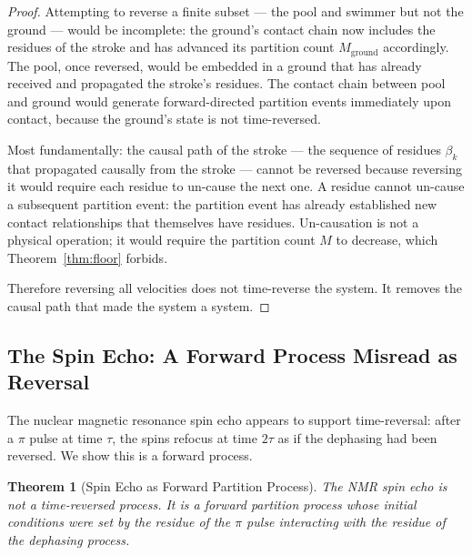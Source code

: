 \documentclass[11pt,twocolumn,a4paper]{article}
\theoremstyle{plain}
\newtheorem{theorem}{Theorem}[section]
\theoremstyle{definition}
\theoremstyle{remark}
\begin{document}
\begin{proof}
Attempting to reverse a finite subset --- the pool and swimmer but not the
ground --- would be incomplete: the ground's contact chain now includes the
residues of the stroke and has advanced its partition count $M_{\mathrm{ground}}$
accordingly. The pool, once reversed, would be embedded in a ground that has
already received and propagated the stroke's residues. The contact chain between
pool and ground would generate forward-directed partition events immediately upon
contact, because the ground's state is not time-reversed.

Most fundamentally: the causal path of the stroke --- the sequence of residues
$\beta_k$ that propagated causally from the stroke --- cannot be reversed because
reversing it would require each residue to un-cause the next one. A residue
cannot un-cause a subsequent partition event: the partition event has already
established new contact relationships that themselves have residues. Un-causation
is not a physical operation; it would require the partition count $M$ to
decrease, which Theorem~\ref{thm:floor} forbids.

Therefore reversing all velocities does not time-reverse the system. It removes
the causal path that made the system a system.
\end{proof}

\subsection{The Spin Echo: A Forward Process Misread as Reversal}
\label{subsec:spin_echo}

The nuclear magnetic resonance spin echo appears to support time-reversal: after
a $\pi$ pulse at time $\tau$, the spins refocus at time $2\tau$ as if the
dephasing had been reversed. We show this is a forward process.

\begin{theorem}[Spin Echo as Forward Partition Process]
\label{thm:spin_echo}
The NMR spin echo is not a time-reversed process. It is a forward partition
process whose initial conditions were set by the residue of the $\pi$ pulse
interacting with the residue of the dephasing process.
\end{theorem}
\end{document}
